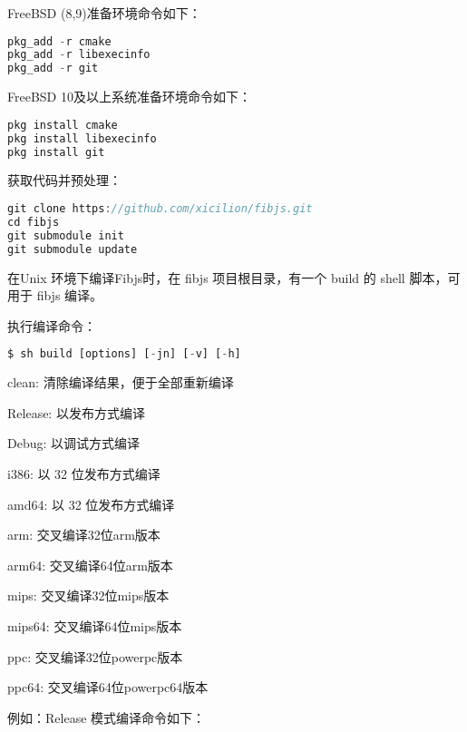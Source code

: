 FreeBSD (8,9)准备环境命令如下：


\begin{lstlisting}[language=JavaScript]
pkg_add -r cmake
pkg_add -r libexecinfo
pkg_add -r git
\end{lstlisting}


FreeBSD 10及以上系统准备环境命令如下：

\begin{lstlisting}[language=JavaScript]
pkg install cmake
pkg install libexecinfo
pkg install git
\end{lstlisting}








获取代码并预处理：


\begin{lstlisting}[language=JavaScript]
git clone https://github.com/xicilion/fibjs.git
cd fibjs
git submodule init
git submodule update
\end{lstlisting}

在Unix 环境下编译Fibjs时，在 fibjs 项目根目录，有一个 build 的 shell 脚本，可用于 fibjs 编译。 

执行编译命令：


\begin{lstlisting}[language=JavaScript]
$ sh build [options] [-jn] [-v] [-h]
\end{lstlisting}

\begin{compactitem}
\item clean: 清除编译结果，便于全部重新编译
\item Release: 以发布方式编译
\item Debug: 以调试方式编译
\item i386: 以 32 位发布方式编译
\item amd64: 以 32 位发布方式编译
\item arm: 交叉编译32位arm版本
\item arm64: 交叉编译64位arm版本
\item mips: 交叉编译32位mips版本
\item mips64: 交叉编译64位mips版本
\item ppc: 交叉编译32位powerpc版本
\item ppc64: 交叉编译64位powerpc64版本
\end{compactitem}

例如：Release 模式编译命令如下：





